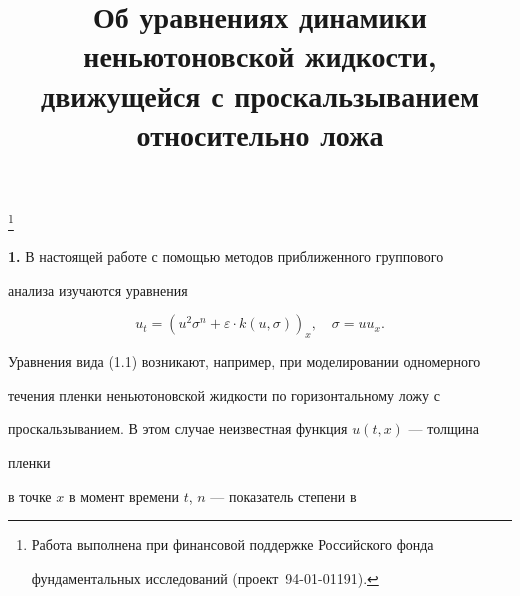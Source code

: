 \title{Об уравнениях динамики неньютоновской жидкости,\\


движущейся с проскальзыванием относительно ложа}





\thanks{Работа выполнена при финансовой поддержке Российского фонда


фундаментальных исследований (проект \No\,94-01-01191).}


\date{}







\pagestyle{plain} %













\maketitle













{\bf 1.} В настоящей работе с помощью методов приближенного группового


анализа изучаются уравнения


\begin{equation}


u_t=(u^2\sigma^n+\varepsilon\cdot k(u,\sigma))_x,\quad


\sigma=uu_x.


\tag{1.1}


\end{equation}


Уравнения вида (1.1) возникают, например, при моделировании одномерного


течения пленки неньютоновской жидкости по горизонтальному ложу с


проскальзыванием. В этом случае неизвестная функция $u(t,x)$ --- толщина


пленки


в точке $x$ в момент времени $t$, $n$ --- показатель степени в


